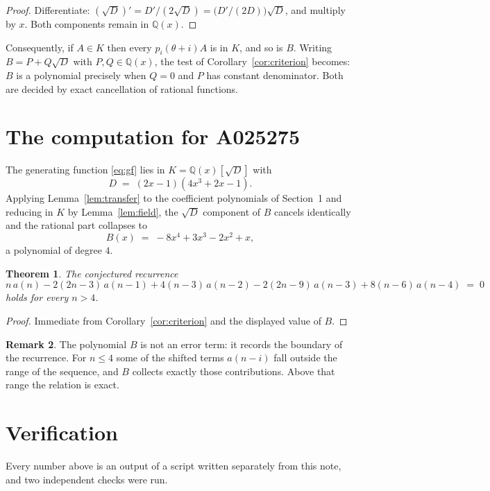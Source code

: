 \documentclass[11pt,a4paper]{article}
\theoremstyle{plain}
\newtheorem{theorem}{Theorem}
\theoremstyle{definition}
\newtheorem{remark}[theorem]{Remark}
\begin{document}
\begin{proof}
Differentiate: $(\sqrt{D})'=D'/(2\sqrt{D})=\bigl(D'/(2D)\bigr)\sqrt{D}$, and multiply by
$x$. Both components remain in $\mathbb{Q}(x)$.
\end{proof}

Consequently, if $A\in K$ then every $p_{i}(\theta+i)A$ is in $K$, and so is $B$. Writing
$B=P+Q\sqrt{D}$ with $P,Q\in\mathbb{Q}(x)$, the test of Corollary~\ref{cor:criterion}
becomes: $B$ is a polynomial precisely when $Q=0$ and $P$ has constant denominator. Both
are decided by exact cancellation of rational functions.

\section{The computation for A025275}

The generating function \eqref{eq:gf} lies in $K=\mathbb{Q}(x)[\sqrt{D}]$ with
\[
D \;=\; \left(2 x - 1\right) \left(4 x^{3} + 2 x - 1\right) .
\]
Applying Lemma~\ref{lem:transfer} to the coefficient polynomials of Section~1 and reducing
in $K$ by Lemma~\ref{lem:field}, the $\sqrt{D}$ component of $B$ cancels identically and
the rational part collapses to
\[
B(x)\;=\;- 8 x^{4} + 3 x^{3} - 2 x^{2} + x ,
\]
a polynomial of degree $4$.

\begin{theorem}
The conjectured recurrence
\[
n\,a(n) -  2 \left(2 n - 3\right)\,a(n-1) + 4 \left(n - 3\right)\,a(n-2) -  2 \left(2 n - 9\right)\,a(n-3) + 8 \left(n - 6\right)\,a(n-4) \;=\;0
\]
holds for every $n>4$.
\end{theorem}

\begin{proof}
Immediate from Corollary~\ref{cor:criterion} and the displayed value of $B$.
\end{proof}

\begin{remark}
The polynomial $B$ is not an error term: it records the boundary of the recurrence. For
$n\le4$ some of the shifted terms $a(n-i)$ fall outside the range of the sequence,
and $B$ collects exactly those contributions. Above that range the relation is exact.
\end{remark}

\section{Verification}

Every number above is an output of a script written separately from this note, and two
independent checks were run.
\end{document}

